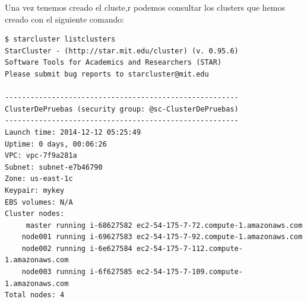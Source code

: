 \documentclass{article}
\begin{document}
	Una vez tenemos creado el cluste,r podemos consultar los clusters que hemos creado con el siguiente comando:
\begin{lstlisting}[style=miniBash]
$ starcluster listclusters
StarCluster - (http://star.mit.edu/cluster) (v. 0.95.6)
Software Tools for Academics and Researchers (STAR)
Please submit bug reports to starcluster@mit.edu

-------------------------------------------------------
ClusterDePruebas (security group: @sc-ClusterDePruebas)
-------------------------------------------------------
Launch time: 2014-12-12 05:25:49
Uptime: 0 days, 00:06:26
VPC: vpc-7f9a281a
Subnet: subnet-e7b46790
Zone: us-east-1c
Keypair: mykey
EBS volumes: N/A
Cluster nodes:
     master running i-68627582 ec2-54-175-7-72.compute-1.amazonaws.com
    node001 running i-69627583 ec2-54-175-7-92.compute-1.amazonaws.com
    node002 running i-6e627584 ec2-54-175-7-112.compute-1.amazonaws.com
    node003 running i-6f627585 ec2-54-175-7-109.compute-1.amazonaws.com
Total nodes: 4
\end{lstlisting}
\end{document}

